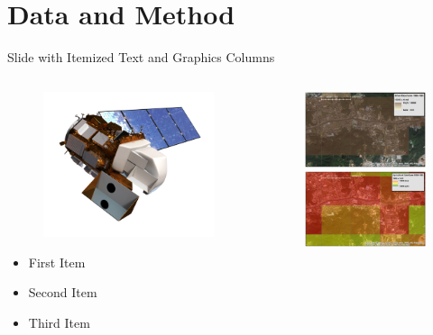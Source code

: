 \documentclass[newPxFont]{beamer}
\begin{document}
\section{Data and Method}
\begin{frame}[c]{Slide with Itemized Text and Graphics Columns}
	\begin{columns}
		\begin{column}{.6\linewidth}
			\begin{figure}
				\centering
				\includegraphics[width=0.4\linewidth]{Landsat8.jpg}
			\end{figure}
	\begin{itemize}
		\item{First Item}\\
		\item{Second Item}\\
		\item{Third Item}\\
	\end{itemize}
		\end{column}
		\begin{column}{.6\linewidth}
			\begin{figure}
				\centering
				\includegraphics[width=.8\linewidth]{CompareHighestResi.eps}

\end{figure}
\end{column}
\end{columns}
\end{frame}
\end{document}
